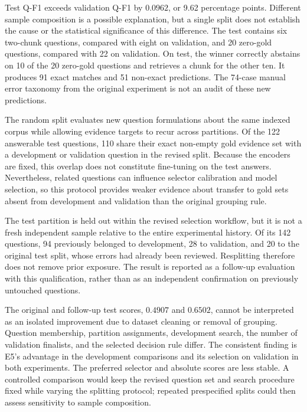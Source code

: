 \documentclass[11pt]{article}
\newcommand{\revision}[1]{{\color{blue}#1}}
\begin{document}
\revision{Test Q-F1 exceeds validation Q-F1 by $0.0962$, or 9.62 percentage points. Different sample composition is a possible explanation, but a single split does not establish the cause or the statistical significance of this difference. The test contains six two-chunk questions, compared with eight on validation, and 20 zero-gold questions, compared with 22 on validation. On test, the winner correctly abstains on 10 of the 20 zero-gold questions and retrieves a chunk for the other ten. It produces 91 exact matches and 51 non-exact predictions. The 74-case manual error taxonomy from the original experiment is not an audit of these new predictions.}

\revision{The random split evaluates new question formulations about the same indexed corpus while allowing evidence targets to recur across partitions. Of the 122 answerable test questions, 110 share their exact non-empty gold evidence set with a development or validation question in the revised split. Because the encoders are fixed, this overlap does not constitute fine-tuning on the test answers. Nevertheless, related questions can influence selector calibration and model selection, so this protocol provides weaker evidence about transfer to gold sets absent from development and validation than the original grouping rule.}

\revision{The test partition is held out within the revised selection workflow, but it is not a fresh independent sample relative to the entire experimental history. Of its 142 questions, 94 previously belonged to development, 28 to validation, and 20 to the original test split, whose errors had already been reviewed. Resplitting therefore does not remove prior exposure. The result is reported as a follow-up evaluation with this qualification, rather than as an independent confirmation on previously untouched questions.}

\revision{The original and follow-up test scores, $0.4907$ and $0.6502$, cannot be interpreted as an isolated improvement due to dataset cleaning or removal of grouping. Question membership, partition assignments, development search, the number of validation finalists, and the selected decision rule differ. The consistent finding is E5's advantage in the development comparisons and its selection on validation in both experiments. The preferred selector and absolute scores are less stable. A controlled comparison would keep the revised question set and search procedure fixed while varying the splitting protocol; repeated prespecified splits could then assess sensitivity to sample composition.}
\end{document}
